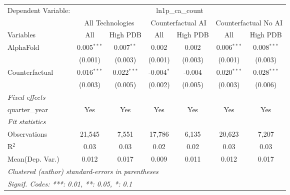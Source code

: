\begingroup
\centering
\begin{tabular}{lcccccc}
   \tabularnewline \midrule \midrule
   Dependent Variable: & \multicolumn{6}{c}{ln1p\_ca\_count}\\
 & \multicolumn{2}{c}{All Technologies} & \multicolumn{2}{c}{Counterfactual AI} & \multicolumn{2}{c}{Counterfactual No AI} \\
\cmidrule(lr){1-1}\cmidrule(lr){2-3} \cmidrule(lr){4-5} \cmidrule(lr){6-7}
Variables & \multicolumn{1}{c}{All} & \multicolumn{1}{c}{High PDB} & \multicolumn{1}{c}{All} & \multicolumn{1}{c}{High PDB} & \multicolumn{1}{c}{All} & \multicolumn{1}{c}{High PDB} \\
\cmidrule(lr){1-1}\cmidrule(lr){2-2} \cmidrule(lr){3-3} \cmidrule(lr){4-4} \cmidrule(lr){5-5} \cmidrule(lr){6-6} \cmidrule(lr){7-7}
   AlphaFold      & 0.005$^{***}$ & 0.007$^{**}$  & 0.002        & 0.002   & 0.006$^{***}$ & 0.008$^{***}$\\   
                  & (0.001)       & (0.003)       & (0.001)      & (0.003) & (0.001)       & (0.003)\\   
   Counterfactual & 0.016$^{***}$ & 0.022$^{***}$ & -0.004$^{*}$ & -0.004  & 0.020$^{***}$ & 0.028$^{***}$\\   
                  & (0.003)       & (0.005)       & (0.002)      & (0.005) & (0.003)       & (0.006)\\   
   \midrule
   \emph{Fixed-effects}\\
   quarter\_year  & Yes           & Yes           & Yes          & Yes     & Yes           & Yes\\  
   \midrule
   \emph{Fit statistics}\\
   Observations   & 21,545        & 7,551         & 17,786       & 6,135   & 20,623        & 7,207\\  
   R$^2$          & 0.03          & 0.03          & 0.02         & 0.02    & 0.03          & 0.03\\  
Mean(Dep. Var.) & 0.012 & 0.017 & 0.009 & 0.011 & 0.012 & 0.017 \\
   \midrule \midrule
   \multicolumn{7}{l}{\emph{Clustered (author) standard-errors in parentheses}}\\
   \multicolumn{7}{l}{\emph{Signif. Codes: ***: 0.01, **: 0.05, *: 0.1}}\\
\end{tabular}
\par\endgroup
